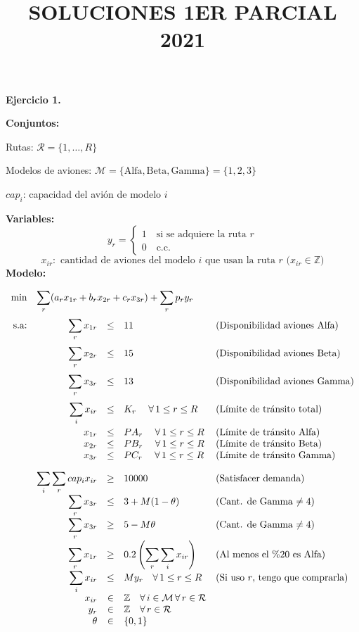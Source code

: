 \documentclass{article}
\title{SOLUCIONES 1ER PARCIAL 2021\vspace{-3em}}
\date{}
\newcommand{\mr}{\mathcal{R}}
\newcommand{\mm}{\mathcal{M}}
\newcommand{\dsum}{\displaystyle\sum}
\begin{document}
\maketitle

\textbf{Ejercicio 1.}

\textbf{Conjuntos:}

Rutas: $\mr=\{1,\dots,R\}$

Modelos de aviones: $\mm=\{\text{Alfa}, \text{Beta}, \text{Gamma}\}=\{1,2,3\}$

$cap_i$: capacidad del avión de modelo $i$

\textbf{Variables:}
\[y_r=\begin{cases} 1\quad \text{si se adquiere la ruta $r$} \\
    0 \quad \text{c.c.} \end{cases}\]
\[x_{ir}\colon \text{ cantidad de aviones del modelo $i$ que usan la ruta $r$ ($x_{ir}\in\mathbb{Z}$)}\]
\textbf{Modelo:}

\[
\begin{array}{rrcll}
    \min & \multicolumn{4}{l}{\dsum_r(a_rx_{1r} + b_rx_{2r} +c_rx_{3r}) + \dsum_r p_ry_r}  \\[1.5em]
    \text{s.a:} & \dsum_r x_{1r} & \leq & 11 & \text{(Disponibilidad aviones Alfa)}\\[1.5em]
     & \dsum_r x_{2r} & \leq & 15 & \text{(Disponibilidad aviones Beta)}\\[1.5em]
     & \dsum_r x_{3r} & \leq & 13 & \text{(Disponibilidad aviones Gamma)}\\[1.5em]
     & \dsum_{i}x_{ir} & \leq & K_r \quad\;\forall\,1\leq r\leq R & \text{(Límite de tránsito total)} \\[1.2em]
     & x_{1r} & \leq & PA_r \quad\;\forall\,1\leq r\leq R& \text{(Límite de tránsito Alfa)}\\
     & x_{2r} & \leq & PB_r \quad\;\forall\,1\leq r\leq R& \text{(Límite de tránsito Beta)}\\
     & x_{3r} & \leq & PC_r \quad\;\forall\,1\leq r\leq R& \text{(Límite de tránsito Gamma)}\\[1em]
     & \dsum_{i}\dsum_r cap_ix_{ir} & \geq & 10000 & \text{(Satisfacer demanda)} \\[1em]
     & \dsum_{r} x_{3r} & \leq & 3 + M(1-\theta) & \text{(Cant. de Gamma $\neq 4$)} \\[1em]
     & \dsum_{r} x_{3r} & \geq & 5 - M\theta & \text{(Cant. de Gamma $\neq 4$)} \\[1em]
     & \dsum_{r} x_{1r} & \geq & 0.2\left(\dsum_{r}\dsum_{i} x_{ir}\right) & \text{(Al menos el \%$20$ es Alfa)} \\[1em]
     & \dsum_{i} x_{ir} & \leq & My_r \quad \forall\,1\leq r\leq R& \text{(Si uso $r$, tengo que comprarla)} \\
     & x_{ir}& \in & \mathbb{Z} \quad \forall\,i\in\mm\,\forall\,r\in\mr & \\
     & y_r & \in & \mathbb{Z} \quad \forall\,r\in\mr & \\
     & \theta & \in & \{0,1\} & \\
\end{array}
\]
\newpage
\end{document}
